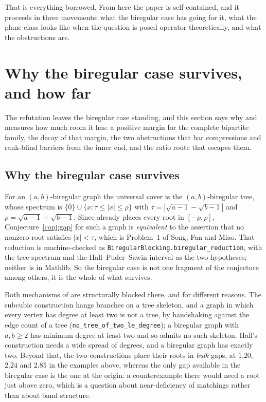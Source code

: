 \documentclass[11pt]{article}
\theoremstyle{remark}
\begin{document}
That is everything borrowed. From here the paper is self-contained, and it proceeds in three
movements: what the biregular case has going for it, what the plane class looks like when the
question is posed operator-theoretically, and what the obstructions are.

\section{Why the biregular case survives, and how far}\label{sec:bireg}

The refutation leaves the biregular case standing, and this section says why and measures how
much room it has: a positive margin for the complete bipartite family, the decay of that margin,
the two obstructions that bar compressions and rank-blind barriers from the inner end, and the
ratio route that escapes them.

\subsection{Why the biregular case survives}\label{sec:biregblock}

For an $(a,b)$-biregular graph the universal cover is the $(a,b)$-biregular tree, whose
spectrum is $\{0\}\cup\{x:\tau\le|x|\le\rho\}$ with
$\tau=|\sqrt{a-1}-\sqrt{b-1}|$ and $\rho=\sqrt{a-1}+\sqrt{b-1}$. Since \cite{HPS} already
places every root in $[-\rho,\rho]$, Conjecture~\ref{conj:gap} for such a graph is
\emph{equivalent} to the assertion that no nonzero root satisfies $|x|<\tau$, which is
Problem~1 of Song, Fan and Miao. That reduction is machine-checked as
\texttt{BiregularBlocking.biregular\_reduction}, with the tree spectrum and the
Hall--Puder--Sawin interval as the two hypotheses; neither is in Mathlib. So the biregular
case is not one fragment of the conjecture among others, it is the whole of what survives.

Both mechanisms of \cite{PartI} are structurally blocked there, and for different
reasons. The subcubic construction hangs branches on a tree skeleton, and a graph in which
every vertex has degree at least two is not a tree, by handshaking against the edge count of
a tree (\texttt{no\_tree\_of\_two\_le\_degree}); a biregular graph with $a,b\ge2$ has minimum
degree at least two and so admits no such skeleton. Hall's construction needs a wide spread of
degrees, and a biregular graph has exactly two. Beyond that, the two constructions place their
roots in \emph{bulk} gaps, at $1.20$, $2.24$ and $2.85$ in the examples above, whereas the
only gap available in the biregular case is the one at the origin: a counterexample there
would need a root just above zero, which is a question about near-deficiency of matchings
rather than about band structure.
\end{document}
